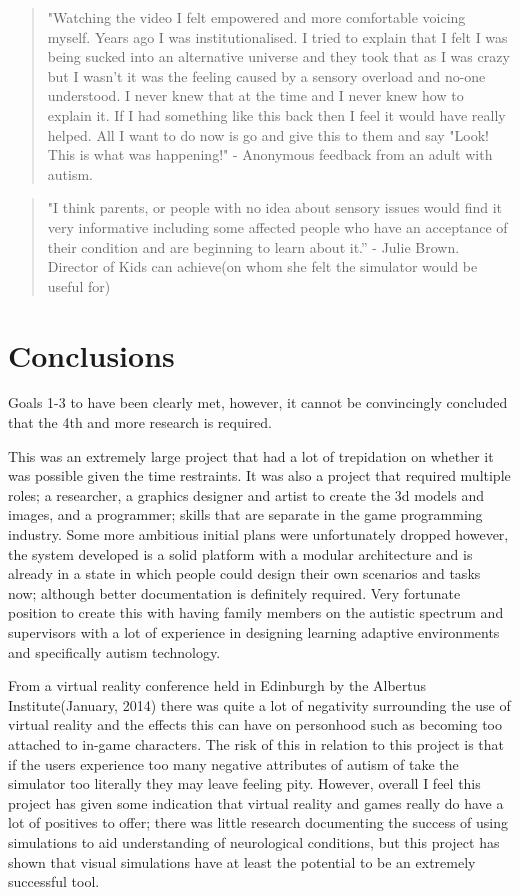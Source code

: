 \documentclass[11pt]{report}
\begin{document}
\begin{quote}
"Watching the video I felt empowered and more comfortable voicing myself. Years ago I was institutionalised. I tried to explain that I felt I was being sucked into an alternative universe and they took that as I was crazy but I wasn't it was the feeling caused by a sensory overload and no-one understood. I never knew that at the time and I never knew how to explain it. If I had something like this back then I feel it would have really helped. All I want to do now is go and give this to them and say "Look! This is what was happening!" - Anonymous feedback from an adult with autism.
\end{quote}

\begin{quote}
"I think parents, or people with no idea about sensory issues would find it very informative including some affected people who have an acceptance of their condition and are beginning to learn about it.” - Julie Brown. Director of Kids can achieve(on whom she felt the simulator would be useful for) 
\end{quote}

\section{Conclusions}
Goals 1-3 to have been clearly met, however, it cannot be convincingly concluded that the 4th and more research is required. 

This was an extremely large project that had a lot of trepidation on whether it was possible given the time restraints. It was also a project that required multiple roles; a researcher, a graphics designer and artist to create the 3d models and images, and a programmer; skills that are separate in the game programming industry. Some more ambitious initial plans were unfortunately dropped however, the system developed is a solid platform with a modular architecture and is already in a state in which people could design their own scenarios and tasks now; although better documentation is definitely required. Very fortunate position to create this with having family members on the autistic spectrum and supervisors with a lot of experience in designing learning adaptive environments and specifically autism technology.

From a virtual reality conference held in Edinburgh by the Albertus Institute(January, 2014) there was quite a lot of negativity surrounding the use of virtual reality and the effects this can have on personhood such as becoming too attached to in-game characters. The risk of this in relation to this project is that if the users experience too many negative attributes of autism of take the simulator too literally they may leave feeling pity. However, overall I feel this project has given some indication that virtual reality and games really do have a lot of positives to offer; there was little research documenting the success of using simulations to aid understanding of neurological conditions, but this project has shown that visual simulations have at least the potential to be an extremely successful tool.
\end{document}
